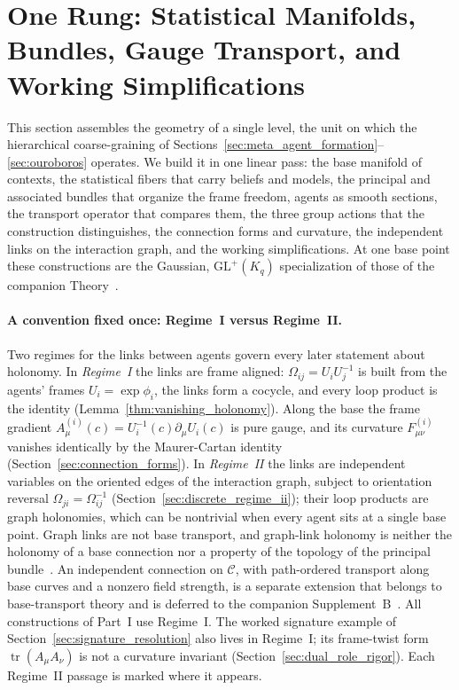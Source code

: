 \section{One Rung: Statistical Manifolds, Bundles, Gauge Transport, and Working Simplifications}\label{sec:one_rung}

This section assembles the geometry of a single level, the unit on which the hierarchical coarse-graining of Sections~\ref{sec:meta_agent_formation}--\ref{sec:ouroboros} operates. We build it in one linear pass: the base manifold of contexts, the statistical fibers that carry beliefs and models, the principal and associated bundles that organize the frame freedom, agents as smooth sections, the transport operator that compares them, the three group actions that the construction distinguishes, the connection forms and curvature, the independent links on the interaction graph, and the working simplifications. At one base point these constructions are the Gaussian, $\mathrm{GL}^+(K_q)$ specialization of those of the companion Theory~\cite[Ch.~2]{DennisGaugeVFE2026}.

\paragraph{A convention fixed once: Regime~I versus Regime~II.}
\label{sec:regime_convention}
Two regimes for the links between agents govern every later statement about holonomy. In \emph{Regime~I} the links are frame aligned: $\Omega_{ij} = U_iU_j^{-1}$ is built from the agents' frames $U_i = \exp\phi_i$, the links form a cocycle, and every loop product is the identity (Lemma~\ref{thm:vanishing_holonomy}). Along the base the frame gradient $A^{(i)}_\mu(c) = U_i^{-1}(c)\partial_\mu U_i(c)$ is pure gauge, and its curvature $F^{(i)}_{\mu\nu}$ vanishes identically by the Maurer-Cartan identity (Section~\ref{sec:connection_forms}). In \emph{Regime~II} the links are independent variables on the oriented edges of the interaction graph, subject to orientation reversal $\Omega_{ji} = \Omega_{ij}^{-1}$ (Section~\ref{sec:discrete_regime_ii}); their loop products are graph holonomies, which can be nontrivial when every agent sits at a single base point. Graph links are not base transport, and graph-link holonomy is neither the holonomy of a base connection nor a property of the topology of the principal bundle~\cite[Ch.~1]{DennisGaugeVFE2026}. An independent connection on $\mathcal{C}$, with path-ordered transport along base curves and a nonzero field strength, is a separate extension that belongs to base-transport theory and is deferred to the companion Supplement~B~\cite{DennisGaugeVFESuppB2026}. All constructions of Part~I use Regime~I. The worked signature example of Section~\ref{sec:signature_resolution} also lives in Regime~I; its frame-twist form $\operatorname{tr}(A_\mu A_\nu)$ is not a curvature invariant (Section~\ref{sec:dual_role_rigor}). Each Regime~II passage is marked where it appears.

